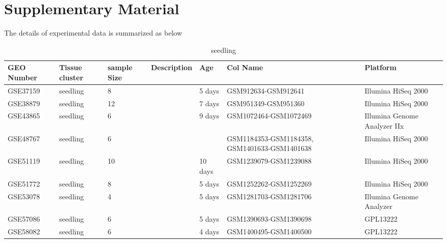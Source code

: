 \documentclass[letterpaper,12pt]{article}
\begin{document}
\section{Supplementary Material}

The details of experimental data is summarized as below


\begin{landscape}
\begin{table}
\footnotesize
\centering
\caption{seedling}
\begin{tabular}{p{2cm}p{3cm}p{1cm}p{2cm}p{1.5cm}p{3cm}p{4cm}} \hline
GEO Number &Tissue cluster & sample Size & Description & Age  &Col Name & Platform\\ \hline
GSE37159 &seedling &8	& & 5 days &GSM912634-GSM912641 & Illumina HiSeq 2000\\  \hline
GSE38879 &seedling &12 &  & 7 days  &GSM951349-GSM951360  &Illumina HiSeq 2000\\ \hline
GSE43865 &seedling & 6  & & 9 days & GSM1072464-GSM1072469 &Illumina Genome Analyzer IIx  \\	\hline
GSE48767 &seedling & 6 & &  &GSM1184353-GSM1184358, GSM1401633-GSM1401638 &Illumina HiSeq 2000 \\ \hline
GSE51119 &seedling  & 10  & &10 days  & GSM1239079-GSM1239088 &Illumina HiSeq 2000 \\ \hline
GSE51772 &seedling  & 8  & &5 days  & GSM1252262-GSM1252269 &Illumina HiSeq 2000 \\ \hline
GSE53078 &seedling &4 &  & 5 days &   GSM1281703-GSM1281706 &Illumina Genome Analyzer \\ \hline
GSE57086 &seedling & 6  &  & 5 days &GSM1390693-GSM1390698 &GPL13222 \\ \hline
GSE58082 &seedling &6  & & 4 days &GSM1400495-GSM1400500 & GPL13222 \\ \hline
\end{tabular} 
\end{table}
\end{landscape}
\end{document}
